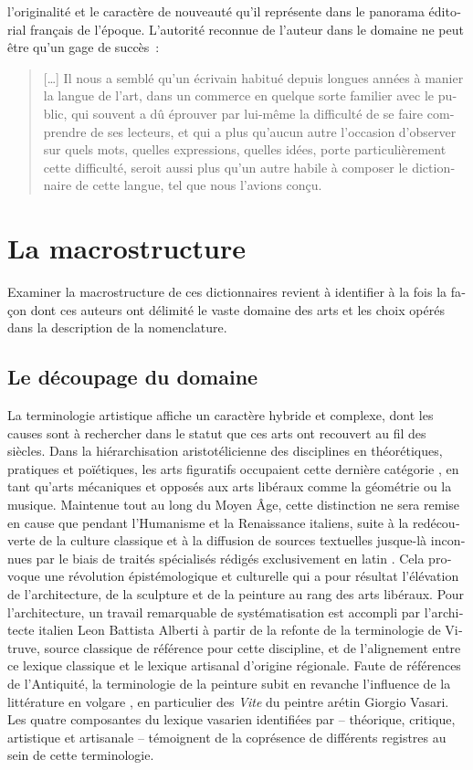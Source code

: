 \documentclass[output=paper,colorlinks,citecolor=brown,arabicfont,chinesefont,booklanguage=french]{langscibook}
\begin{document}
\begin{otherlanguage}{french}
l’originalité et le caractère de nouveauté qu’il représente dans le panorama éditorial français de l’époque. L’autorité reconnue de l’auteur dans le domaine ne peut être qu’un gage de succès~: 

\begin{quote}
    […] Il nous a semblé qu’un écrivain habitué depuis longues années à manier la langue de l’art, dans un commerce en quelque sorte familier avec le public, qui souvent a dû éprouver par lui-même la difficulté de se faire comprendre de ses lecteurs, et qui a plus qu’aucun autre l’occasion d’observer sur quels mots, quelles expressions, quelles idées, porte particulièrement cette difficulté, seroit aussi plus qu’un autre habile à composer le dictionnaire de cette langue, tel que nous l’avions conçu. 
\end{quote}

\section{La macrostructure}

Examiner la macrostructure de ces dictionnaires revient à identifier à la fois la façon dont ces auteurs ont délimité le vaste domaine des arts et les choix opérés dans la description de la nomenclature. 

\subsection{Le découpage du domaine}

La terminologie artistique affiche un caractère hybride et complexe, dont les causes sont à rechercher dans le statut que ces arts ont recouvert au fil des siècles. Dans la hiérarchisation aristotélicienne des disciplines en théorétiques, pratiques et poïétiques, les arts figuratifs occupaient cette dernière catégorie \citep{Eusebi2013}, en tant qu’arts mécaniques et opposés aux arts libéraux comme la géométrie ou la musique. Maintenue tout au long du Moyen Âge, cette distinction ne sera remise en cause que pendant l’Humanisme et la Renaissance italiens, suite à la redécouverte de la culture classique et à la diffusion de sources textuelles jusque-là inconnues par le biais de traités spécialisés rédigés exclusivement en latin \citep{Biffi2007}. Cela provoque une révolution épistémologique et culturelle qui a pour résultat l’élévation de l’architecture, de la sculpture et de la peinture au rang des arts libéraux. Pour l’architecture, un travail remarquable de systématisation est accompli par l’architecte italien Leon Battista Alberti à partir de la refonte de la terminologie de Vitruve, source classique de référence pour cette discipline, et de l’alignement entre ce lexique classique et le lexique artisanal d’origine régionale. Faute de références de l’Antiquité, la terminologie de la peinture subit en revanche l’influence de la littérature en volgare \citep[8]{Motolese2012}, en particulier des \emph{Vite} du peintre arétin Giorgio Vasari. Les quatre composantes du lexique vasarien identifiées par \citet[12]{Le_molle1988} – théorique, critique, artistique et artisanale – témoignent de la coprésence de différents registres au sein de cette terminologie.


\end{otherlanguage}
\end{document}
